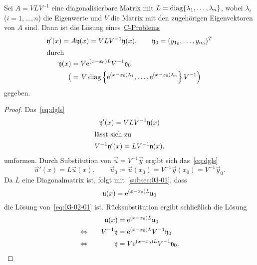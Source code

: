 \begin{theorem}\label{thm:diagbar-cp-solution}
    Sei $A = V L V^{-1}$ eine diagonalisierbare Matrix mit $L = \diag\{\lambda_1,\dots,\lambda_n\}$,
    wobei $\lambda_i$ ($i = 1,\dots,n$) die Eigenwerte und $V$ die Matrix mit den zugehörigen Eigenvektoren von $A$ sind.
    Dann ist die Lösung eines~\hyperref[eq:cp]{C-Problems}
    \begin{gather*}
        \vec{y}'(x) = A \vec{y}(x) = V L V^{-1} \vec{y}(x), \qquad \vec{y}_0 = (y_{1_0},\dots,y_{n_0})^T\\
        \intertext{durch}
        \begin{aligned}
            \vec{y}(x)
            &= V \e^{(x - x_0) L} V^{-1} \vec{y}_0\\
            \big( &= \left. V \diag\left\{\e^{(x - x_0) \lambda_1}, \dots,\e^{(x - x_0) \lambda_n}\right\} V^{-1} \right)
        \end{aligned}
    \end{gather*}
    gegeben.
\end{theorem}

\begin{proof}
    Das~\ref{eq:dgls}
    \begin{gather*}
        \vec{y}'(x) = V L V^{-1} \vec{y}(x)\\
        \intertext{lässt sich zu}
        V^{-1} \vec{y}'(x) = L V^{-1} \vec{y}(x).
    \end{gather*}
    umformen.
    Durch Substitution von $\vec{u} = V^{-1} \vec{y}$ ergibt sich das~\ref{eq:dgls}
    \begin{equation}\tag{$\triangle$}\label{eq:03-02-01}
        \vec{u}'(x) = L \vec{u}(x), \qquad \vec{u}_0 \coloneqq \vec{u}(x_0) = V^{-1} \vec{y}(x_0) = V^{-1} \vec{y}_0.
    \end{equation}
    Da $L$ eine Diagonalmatrix ist, folgt mit~\autoref{subsec:03-01}, dass
    \begin{equation*}
        \vec{u}(x) = \e^{(x - x_0) L} \vec{u}_0
    \end{equation*}
    die Lösung von~\eqref{eq:03-02-01} ist.
    Rücksubstitution ergibt schließlich die Lösung
    \begin{alignat*}{2}
                             && \vec{u}(x) &= \e^{(x - x_0) L} \vec{u}_0\\
        \Leftrightarrow\quad && V^{-1} \vec{y} &= \e^{(x - x_0) L} V^{-1} \vec{y}_0\\
        \Leftrightarrow\quad && \vec{y} &= V \e^{(x - x_0) L} V^{-1} \vec{y}_0.
    \end{alignat*}
\end{proof}

